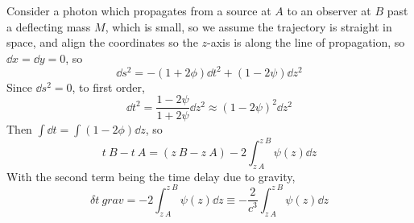 Consider a photon which propagates from a source at $A$ to an observer
at $B$ past a deflecting mass $M$, which is small, so we assume the
trajectory is straight in space, and align the coordinates so the
$z$-axis is along the line of propagation, so $\dd{x}=\dd{y}=0$, so
\begin{equation}
  \label{eq:197}
  \dd{s}^2 = - (1+2 \phi) \dd{t}^2 + (1-2 \psi) \dd{z}^2
\end{equation}
Since $\dd{s}^2 = 0$, to first order,
\begin{equation}
  \label{eq:198}
  \dd{t}^2 = \frac{1-2\psi}{1+2\psi} \dd{z}^2 \approx (1-2\psi)^2 \dd{z}^2
\end{equation}
Then $\int \dd{t} = \int(1-2\phi) \dd{z}$, so
\begin{equation}
  \label{eq:199}
  t~B - t~A = (z~B - z~A) - 2 \int_{z~A}^{z~B} \psi(z) \dd{z}
\end{equation}
With the second term being the time delay due to gravity,
\begin{equation}
  \label{eq:200}
  \delta t~{grav} = -2 \int_{z~A}^{z~B} \psi(z) \dd{z} \equiv -\frac{2}{c^3} \int_{z~A}^{z~B} \psi(z) \dd{z}
\end{equation}
